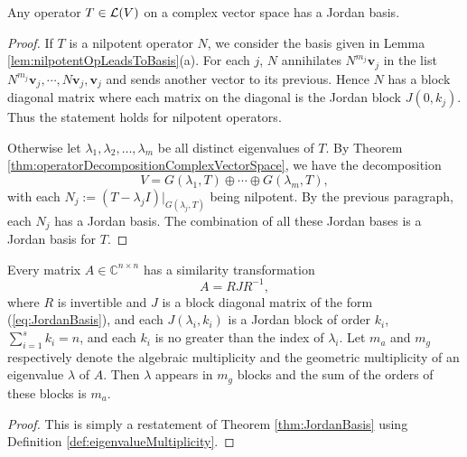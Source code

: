 \begin{thm}[Jordan]
  \label{thm:JordanBasis}
  Any operator $T\in{\cal L}(V)$ on a complex vector space
  has a Jordan basis.
\end{thm}
\begin{proof}
  If $T$ is a nilpotent operator $N$,
  we consider the basis given in
  Lemma \ref{lem:nilpotentOpLeadsToBasis}(a).
  For each $j$, $N$ annihilates
  $N^{m_j}\mathbf{v}_j$ in the list
  $N^{m_j}\mathbf{v}_j, \cdots, N\mathbf{v}_j, \mathbf{v}_j$
  and sends another vector to its previous.
  Hence
  $N$ has a block diagonal matrix where each matrix
  on the diagonal is the Jordan block $J(0,k_j)$.
  Thus the statement holds for nilpotent operators.
  
  Otherwise let $\lambda_1, \lambda_2, \ldots, \lambda_m$
  be all distinct eigenvalues of $T$.
  By Theorem \ref{thm:operatorDecompositionComplexVectorSpace},
  we have the decomposition
  \begin{displaymath}
    V=G(\lambda_1,T)\oplus \cdots \oplus G(\lambda_m, T),
  \end{displaymath}
  with each $N_j:=(T-\lambda_jI)|_{G(\lambda_j, T)}$ being nilpotent.
  By the previous paragraph, each $N_j$ has a Jordan basis.
  The combination of all these Jordan bases is a Jordan basis for $T$.
\end{proof}

\begin{thm}
  \label{thm:JordanDecomp}
  Every matrix $A\in\mathbb{C}^{n\times n}$ has a similarity transformation
  \begin{equation}
    \label{eq:JordanCanoForm}
    A = RJR^{-1},
  \end{equation}
  where $R$ is invertible and
  $J$ is a block diagonal matrix of the form (\ref{eq:JordanBasis}), 
  and each $J(\lambda_i, k_i)$ is a Jordan block of order $k_i$, 
  $\sum_{i=1}^sk_i=n$, and each $k_i$ is no greater
  than the index of $\lambda_i$.
  Let $m_a$ and $m_g$ respectively denote
  the algebraic multiplicity and
  the geometric multiplicity of an eigenvalue $\lambda$ of $A$.
  Then $\lambda$ appears in $m_g$ blocks and
  the sum of the orders of these blocks is $m_a$.
\end{thm}
\begin{proof}
  This is simply a restatement of Theorem \ref{thm:JordanBasis}
  using Definition \ref{def:eigenvalueMultiplicity}.
\end{proof}



